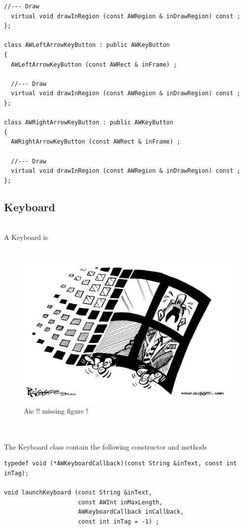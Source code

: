 \documentclass[a4paper,11pt]{extarticle}
\begin{document}
\begin{lstlisting}[language=Arduinonl]
  //--- Draw
  virtual void drawInRegion (const AWRegion & inDrawRegion) const ;
};

class AWLeftArrowKeyButton : public AWKeyButton
{
  AWLeftArrowKeyButton (const AWRect & inFrame) ;
  
  //--- Draw
  virtual void drawInRegion (const AWRegion & inDrawRegion) const ;
};

class AWRightArrowKeyButton : public AWKeyButton
{
  AWRightArrowKeyButton (const AWRect & inFrame) ;
  
  //--- Draw
  virtual void drawInRegion (const AWRegion & inDrawRegion) const ;
};
\end{lstlisting}


\newpage
\subsection{Keyboard}

~\\ A Keyboard is 
~\\
~\\

\begin{figure}[htbp]
   \centering
   \includegraphics[scale=0.55]{AWFig.png} 
   \caption{Aie !! missing figure !}
   \label{fig:18 }
\end{figure}

~\\

~\\ The Keyboard class contain the following constructor and methods

\begin{lstlisting}[language=Arduinonl]
typedef void (*AWKeyboardCallback)(const String &inText, const int inTag);

void launchKeyboard (const String &inText,
                     const AWInt inMaxLength,
                     AWKeyboardCallback inCallback,
                     const int inTag = -1) ;
\end{lstlisting}
\end{document}
